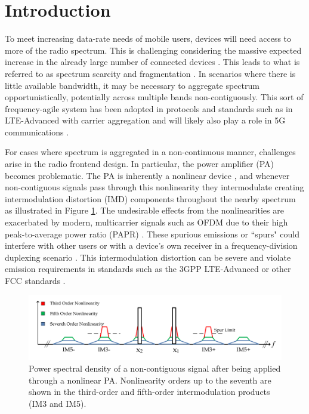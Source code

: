 \section{Introduction}
To meet increasing data-rate needs of mobile users, devices will need access to more of the radio spectrum. 
This is challenging considering the massive expected increase in the already large number of connected devices \cite{Cisco16}.
This leads to what is referred to as spectrum scarcity and fragmentation \cite{Staple04,Federated17}. 
In scenarios where there is little available bandwidth, it may be necessary to aggregate spectrum opportunistically, potentially across multiple bands non-contiguously. 
This sort of frequency-agile system has been adopted in protocols and standards such as in LTE-Advanced with carrier aggregation \cite{wannstrom_2013} and will likely also play a role in 5G communications \cite{Khan2014}.  

For cases where spectrum is aggregated in a non-continuous manner, challenges arise in the radio frontend design. 
In particular, the power amplifier (PA) becomes problematic. 
The PA is inherently a nonlinear device \cite{Ghannouchi09}, and whenever non-contiguous signals pass through this nonlinearity they intermodulate creating intermodulation distortion (IMD) components throughout the nearby spectrum as illustrated in Figure \ref{fig:PSD}.
{\color{red} The undesirable effects from the nonlinearities are exacerbated by modern, multicarrier signals such as OFDM due to their high peak-to-average power ratio (PAPR) \cite{Ghannouchi09}.}
These spurious emissions or ``spurs" could interfere with other users or with a device's own receiver in a frequency-division duplexing scenario \cite{Park13}. 
This intermodulation distortion can be severe and violate emission requirements in standards such as the 3GPP LTE-Advanced or other FCC standards    \cite{Commag_abdelaziz,3GPP_CA_Emissions_1,3GPP_CA_Emissions_2,LaehteensuoMay2013}. 

\begin{figure}
	\centering
	\centerline{\includegraphics[width=\columnwidth]{./Figures/PSD.pdf}}
	\caption[]{Power spectral density of a non-contiguous signal after being applied through a nonlinear PA.
		Nonlinearity orders up to the seventh are shown in the third-order and fifth-order intermodulation products (IM3 and IM5).}
	\label{fig:PSD}
\end{figure}

